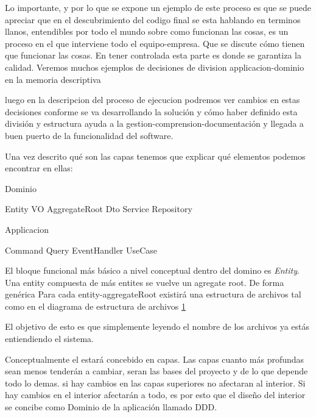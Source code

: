 Lo importante, y por lo que se expone un ejemplo de este proceso es que se puede apreciar que en el descubrimiento del codigo final se esta hablando en terminos llanos, entendibles por todo el mundo sobre como funcionan las cosas, es un proceso en el que interviene todo el equipo-empresa. Que se discute cómo tienen que funcionar las cosas. En tener controlada esta parte es donde se garantiza la calidad. Veremos muchos ejemplos de decisiones de division applicacion-dominio en la memoria descriptiva

luego en la descripcion del proceso de ejecucion podremos ver cambios en estas decisiones conforme se va desarrollando la solución y cómo haber definido esta división y estructura ayuda a la gestion-comprension-documentación y llegada a buen puerto de la funcionalidad del software.


Una vez descrito qué son las capas tenemos que explicar qué elementos podemos encontrar en ellas:


Dominio

Entity
VO
AggregateRoot
Dto
Service
Repository

Applicacion

Command
Query
EventHandler
UseCase


El bloque funcional más básico a nivel conceptual dentro del domino es \textit{Entity}. Una entity compuesta de más entites se vuelve un agregate root. De forma genérica Para cada entity-aggregateRoot existirá una estructura de archivos tal como en el diagrama de estructura de archivos \ref{fig:folderEntity}

\begin{figure}[h]
    \caption{}
    \label{fig:folderEntity}
\end{figure}

El objetivo de esto es que simplemente leyendo el nombre de los archivos ya estás entiendiendo el sistema.

Conceptualmente el estará concebido en capas. Las capas cuanto más profundas sean menos tenderán a cambiar, seran las bases del proyecto y de lo que depende todo lo demas. si hay cambios en las capas superiores no afectaran al interior. Si hay cambios en el interior afectarán a todo, es por esto que el diseño del interior se concibe como Dominio de la aplicación llamado DDD.

